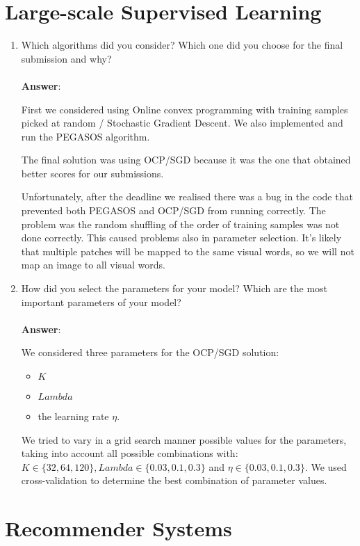 \documentclass[11pt]{article}
\begin{document}
\section{Large-scale Supervised Learning}

\begin{enumerate}
\item Which algorithms did you consider? Which one did you choose for the
  final submission and why? \\ \\
\textbf{Answer}:

First we considered using Online convex programming with training samples picked at random / Stochastic Gradient Descent. We also implemented and run
the PEGASOS algorithm. 

The final solution was using OCP/SGD because it was the one that obtained better scores for our submissions. 

Unfortunately, after the deadline we realised there was a bug in the code that prevented both PEGASOS and OCP/SGD from running correctly. The problem
was the random shuffling of the order of training samples was not done correctly. This caused problems also in parameter selection. It's likely that multiple patches will be mapped to the same visual words, so we will not map an image to all visual words.

\item How did you select the parameters for your model? Which are the
  most important parameters of your model? \\ \\
\textbf{Answer}:

We considered three parameters for the OCP/SGD solution: 
\begin{itemize}
\item $K$
\item $Lambda$ 
\item the learning rate $\eta$.
\end{itemize}

We tried to vary in a grid search manner possible values for the parameters, taking into account all possible combinations with: $K \in \{32, 64, 120\}, Lambda \in \{0.03, 0.1, 0.3\}$ and $\eta \in \{0.03, 0.1, 0.3\}$. We used cross-validation to determine the best combination of parameter values.

\end{enumerate}

\section{Recommender Systems}
\end{document}

